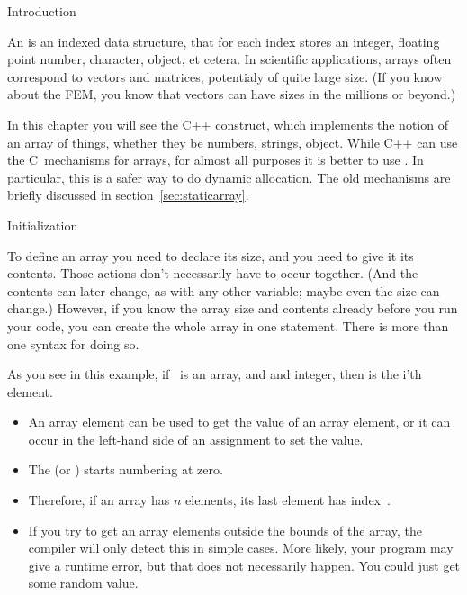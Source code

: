 
 {Introduction}

An  is an indexed data structure, that for each
index stores an integer, floating point number, character,
object, et cetera.
In scientific applications, arrays often correspond to vectors and
matrices, potentialy of quite large size. (If you know about the
\acf{FEM}, you know that vectors can have sizes in the millions or beyond.)

In this chapter you will see the C++  construct,
which implements the notion of an array of things, whether they be
numbers, strings, object.
While C++ can use the C~mechanisms for arrays, for almost all purposes
it is better to use . In particular, this is a safer way to
do dynamic allocation. The old
mechanisms are briefly discussed in section~\ref{sec:staticarray}.

 {Initialization}

To define an array you need to declare its size, and you need to give
it its contents. Those actions don't necessarily have to occur
together. (And the contents can later change, as with any other
variable; maybe even the size can change.)
However, 
if you know the array size and contents already before you run your
code, you can create the whole array in one statement. There is more
than one syntax for doing so.
%

As you see in this example, if ~is an array, and  and
integer, then  is the i'th element.
\begin{itemize}
\item An array element  can be used to get the value of an
  array element, or it can occur in the left-hand side of an
  assignment to set the value.
\item The  (or
  )  starts numbering at zero.
\item Therefore, if an array has $n$ elements, its last element has
  index~.
\item If you try to get an array elements outside the bounds of the
  array, the compiler will only detect this in simple cases. More
  likely, your program may give a runtime error, but that does not
  necessarily happen. You could just get some random value.
\end{itemize}

